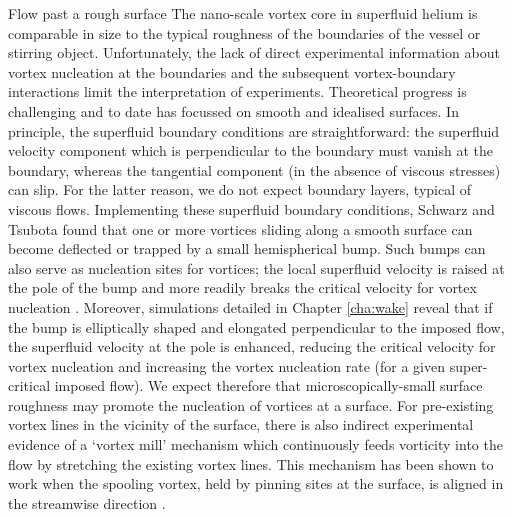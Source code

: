 \begin{chapter}{\label{cha:afm}Flow past a rough surface}
The nano-scale vortex core in superfluid helium is comparable in size 
to the typical roughness of the boundaries of the vessel or stirring object. 
Unfortunately, the lack of direct experimental information about vortex 
nucleation at the boundaries and the subsequent vortex-boundary interactions
limit the interpretation of experiments. Theoretical
progress is challenging and to date has focussed on smooth and idealised surfaces.  In principle, the superfluid boundary conditions
are straightforward:
the superfluid velocity
component which is perpendicular to the boundary must vanish
at the boundary, whereas the tangential component (in the absence of
viscous stresses) can slip.  For the latter reason, we do not expect boundary layers,
typical of viscous flows.   
Implementing these {superfluid} boundary conditions, 
Schwarz \cite{Schwarz-bump}
and Tsubota \cite{PhysRevB.50.579}
found that one or more vortices sliding along a smooth surface
can become deflected or trapped by a small
hemispherical bump.  Such bumps can also serve as nucleation sites for vortices;  the local superfluid velocity is raised at the pole of the bump and more readily breaks the critical velocity for vortex nucleation \cite{win01}.  Moreover, simulations detailed in Chapter \ref{cha:wake} reveal that if the bump is elliptically shaped and elongated perpendicular to the imposed flow, the superfluid velocity at the pole
is enhanced, reducing the critical velocity for vortex nucleation and increasing the vortex nucleation rate (for a given super-critical imposed flow). 
We expect therefore that microscopically-small surface roughness may promote the nucleation of vortices at a surface.
For pre-existing vortex lines in the vicinity of the surface, there is also indirect experimental evidence of a `vortex mill' mechanism 
which continuously feeds vorticity into the flow by stretching 
{the existing vortex} lines. This mechanism has been shown to work when the spooling vortex, 
held by pinning sites at the surface, is aligned in the streamwise direction \cite{PhysRevLett.64.1130}.


\end{chapter}
